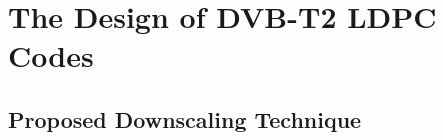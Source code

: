 \documentclass[11pt, aspectratio=169]{beamer}
\begin{document}
\section{The Design of DVB-T2 LDPC Codes}

\subsection{Proposed Downscaling Technique}
\end{document}
